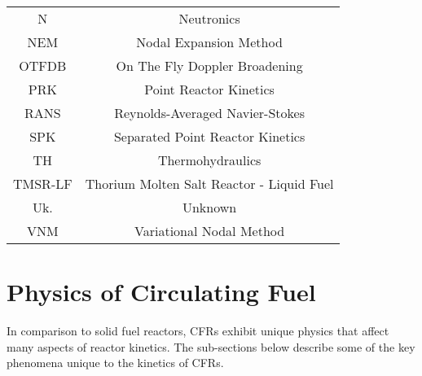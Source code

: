 \documentclass[review]{elsarticle}
\begin{document}
\begin{table}[h]
\begin{center}
\begin{tabular}{|c c|}
            N & Neutronics \\
            NEM & Nodal Expansion Method \\
            OTFDB & On The Fly Doppler Broadening \\
            PRK & Point Reactor Kinetics \\
            RANS & Reynolds-Averaged Navier-Stokes \\
            SPK & Separated Point Reactor Kinetics \\
            TH & Thermohydraulics \\
            TMSR-LF & Thorium Molten Salt Reactor - Liquid Fuel \\
            Uk. & Unknown \\
            VNM & Variational Nodal Method \\
            \hline
        \end{tabular}
    \end{center}
\end{table}

\section{Physics of Circulating Fuel} \label{sec:physics}
In comparison to solid fuel reactors, CFRs exhibit unique
physics that affect many aspects of reactor kinetics. The sub-sections below 
describe some of the key phenomena unique to the kinetics of CFRs.
\end{document}
